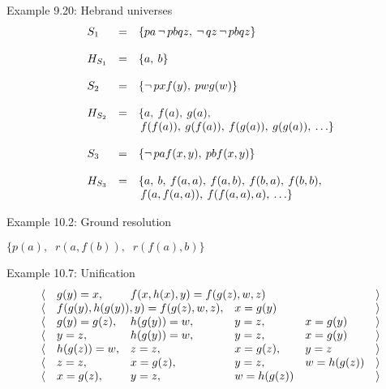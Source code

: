 \documentclass[style=simple,size=12pt]{powerdot}
\begin{document}
\begin{wideslide}[bm=,toc=]{Example 9.20: Hebrand universes}
\vspace*{-5mm}
\begin{displaymath}
\begin{array}{lcl}
S_{1}&=& \{pa\mathop{\neg} pbqz,\: \mathop{\neg} qz\mathop{\neg} pbqz\}\\ \\
H_{S_{1}}&=& \{a,\: b\}\\ \\
S_{2}&=&\{\mathop{\neg} pxf(y),\: pwg(w)\}\\ \\
H_{S_{2}}&=&\{a,\: f(a),\:  g(a),\:  \\
& &\, f(f(a)),\: g(f(a)),\: f(g(a)),\: g(g(a)),\: \ldots\}\\ \\
S_{3}&=&\{\mathop{\neg} paf(x,y),\: pbf(x,y)\}\\ \\
H_{S_{3}}&=& \{a,\:  b,\:  f(a,a),\:
             f(a,b),\: f(b,a),\: f(b,b), \\
  & &\,f(a,f(a,a)),\: f(f(a,a),a),\: \ldots\}
\end{array}
\end{displaymath}
\end{wideslide}

\begin{wideslide}[bm=,toc=]{Example 10.2: Ground resolution}
\begin{center}
\setlength{\GapWidth}{12mm}
\setlength{\GapDepth}{12mm}
\begin{bundle}{$\{p(a),\;\; r(a,f(b)),\;\; r(f(a),b)\}$}
\end{bundle}
\end{center}
\end{wideslide}

\begin{wideslide}[bm=,toc=]{Example 10.7: Unification}
\begin{displaymath}
\begin{array}{llllll}
\langle&g(y)=x,&\multicolumn{2}{l}{f(x,h(x),y)=f(g(z),w,z)}&&\rangle\\
\langle&\multicolumn{2}{l}{f(g(y),h(g(y)),y)=f(g(z),w,z),}&x=g(y)&&\rangle\\
\langle&g(y)=g(z),&h(g(y))=w,&y=z,&x=g(y)&\rangle\\
\langle&y=z,&h(g(y))=w,&y=z,&x=g(y)&\rangle\\
\langle&h(g(z))=w,&z=z,&x=g(z),&y=z&\rangle\\
\langle&z=z,&x=g(z),&y=z,&w=h(g(z))&\rangle\\
\langle&x=g(z),&y=z,&w=h(g(z))&&\rangle
\end{array}
\end{displaymath}
\end{wideslide}
\end{document}
